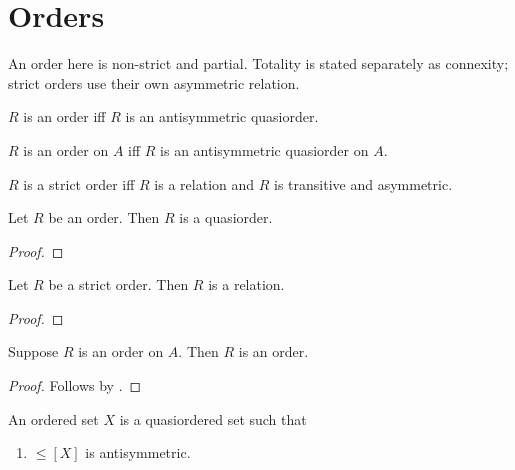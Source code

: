 


\section{Orders}

An order here is non-strict and partial. Totality is stated separately as
connexity; strict orders use their own asymmetric relation.
\begin{abbreviation}\label{order}
    $R$ is an order iff
        $R$ is an antisymmetric quasiorder.
\end{abbreviation}

\begin{abbreviation}\label{order_on}
    $R$ is an order on $A$ iff
        $R$ is an antisymmetric quasiorder on $A$.
\end{abbreviation}

\begin{abbreviation}\label{strictorder}
    $R$ is a strict order iff
        $R$ is a relation and $R$ is transitive and asymmetric.
\end{abbreviation}

\begin{classification}\label{order_is_quasiorder}
    Let $R$ be an order.
    Then $R$ is a quasiorder.
\end{classification}
\begin{proof}
\end{proof}

\begin{classification}\label{strictorder_is_relation}
    Let $R$ be a strict order.
    Then $R$ is a relation.
\end{classification}
\begin{proof}
\end{proof}

\begin{proposition}\label{order_on_implies_order}
    Suppose $R$ is an order on $A$.
    Then $R$ is an order.
\end{proposition}
\begin{proof}
    Follows by .
\end{proof}

\begin{struct}\label{orderedset}
    An ordered set $X$ is a quasiordered set such that
    \begin{enumerate}
        \item\label{orderedset_antisym}
            $\leq[X]$ is antisymmetric.
    \end{enumerate}
\end{struct}

